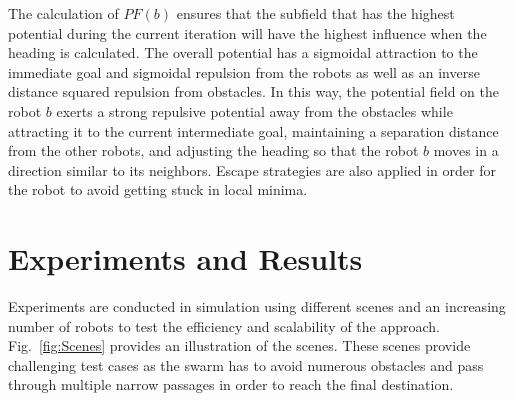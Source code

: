 \documentclass{llncs}
\begin{document}
The calculation of $PF(b)$ ensures that the subfield that has the
highest potential during the current iteration will have the highest
influence when the heading is calculated. The overall potential has a
sigmoidal attraction to the immediate goal and sigmoidal repulsion
from the robots as well as an inverse distance squared repulsion from
obstacles. In this way, the potential field on the robot $b$ exerts a
strong repulsive potential away from the obstacles while attracting it
to the current intermediate goal, maintaining a separation distance
from the other robots, and adjusting the heading so that the robot $b$
moves in a direction similar to its neighbors. Escape strategies are
also applied in order for the robot to avoid getting stuck in local
minima.


\section{Experiments and Results}
\label{sec:ExpResults}

Experiments are conducted in simulation using different scenes and an
increasing number of robots to test the efficiency and scalability of
the approach. Fig.~\ref{fig:Scenes} provides an illustration of the
scenes. These scenes provide challenging test cases as the swarm has
to avoid numerous obstacles and pass through multiple narrow passages
in order to reach the final destination.
\end{document}
